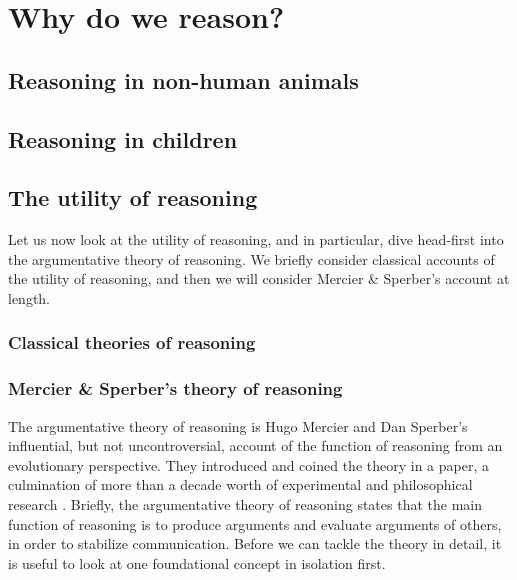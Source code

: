 \chapter{Why do we reason?}
\label{ch:reasoning}


\section{Reasoning in non-human animals}

\section{Reasoning in children}

\section{The utility of reasoning}

Let us now look at the utility of reasoning, and in particular, dive head-first into the argumentative theory of reasoning.
We briefly consider classical accounts of the utility of reasoning, and then we will consider Mercier \& Sperber's account at length.

\subsection{Classical theories of reasoning}

\subsection{Mercier \& Sperber's theory of reasoning}


The argumentative theory of reasoning is Hugo Mercier and Dan Sperber's influential, but not uncontroversial, account of the function of reasoning from an evolutionary perspective. They introduced and coined the theory in a \citeyear{MS11} paper, a culmination of more than a decade worth of experimental and philosophical research .
Briefly, the argumentative theory of reasoning states that the main function of reasoning is to produce arguments and evaluate arguments of others, in order to stabilize communication.
Before we can tackle the theory in detail, it is useful to look at one foundational concept in isolation first.

